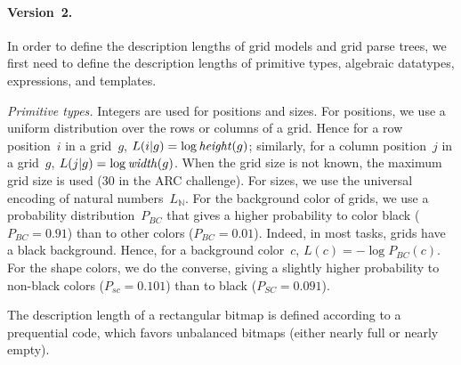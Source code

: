 \documentclass[a4paper]{llncs}
\newcommand{\KILL}[1]{}
\newcommand{\nat}{\mathbb{N}}
\begin{document}
\paragraph{Version~2.}
In order to define the description lengths of grid models and grid
parse trees, we first need to define the description lengths of
primitive types, algebraic datatypes, expressions, and templates.

{\em Primitive types.} Integers are used for positions and sizes. For
positions, we use a uniform distribution over the rows or columns of a
grid. Hence for a row position~$i$ in a grid~$g$,
$L(i|g) = \log {\it height}(g)$; similarly, for a column position~$j$
in a grid~$g$, $L(j|g) = \log {\it width}(g)$. When the grid size is
not known, the maximum grid size is used (30 in the ARC challenge).
%
For sizes, we use the universal encoding of natural numbers~$L_\nat$.
%
For the background color of grids, we use a probability
distribution~$P_{BC}$ that gives a higher probability to color black
($P_{BC} = 0.91$) than to other colors ($P_{BC} = 0.01$). Indeed, in
most tasks, grids have a black background. Hence, for a background
color~$c$, $L(c) = -\log P_{BC}(c)$. \KILL{We then define the
  description length of background colors $L_{BC}(c)$ as
  $L_{P_{bc}}(c)$.} For the shape colors, we do the converse, giving a
slightly higher probability to non-black colors ($P_{sc} = 0.101$)
than to black ($P_{SC} = 0.091$).
%
\KILL{Version up to 2.2: The description length of a rectangular bitmap is simply defined as
  its number of cells: $L(m) = height(m) \times width(m)$.
}
%
The description length of a rectangular bitmap is defined according to
a prequential code, which favors unbalanced bitmaps (either nearly
full or nearly empty).
\end{document}
